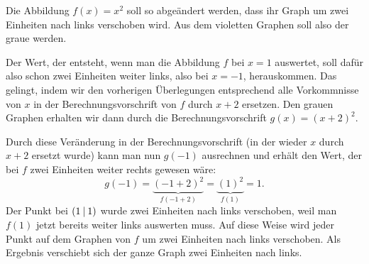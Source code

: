 \documentclass[../../main.tex]{subfiles}
\begin{document}
\begin{example}
    Die Abbildung $f(x)=x^2$ soll so abgeändert werden, dass ihr Graph um zwei Einheiten nach links verschoben wird. Aus dem violetten Graphen soll also der graue werden.
    \begin{center}
    \end{center}
    Der Wert, der entsteht, wenn man die Abbildung $f$ bei $x=1$ auswertet, soll dafür also schon zwei Einheiten weiter links, also bei $x=-1$, herauskommen. Das gelingt, indem wir den vorherigen Überlegungen entsprechend alle Vorkommnisse von $x$ in der Berechnungsvorschrift von $f$ durch $x+2$ ersetzen. Den grauen Graphen erhalten wir dann durch die Berechnungsvorschrift $g(x)=(x+2)^2$. 
    
    Durch diese Veränderung in der Berechnungsvorschrift (in der wieder $x$ durch $x+2$ ersetzt wurde) kann man nun $g(-1)$ ausrechnen und erhält den Wert, der bei $f$ zwei Einheiten weiter rechts gewesen wäre:
    \[g(-1)=\underbrace{(-1+2)^2}_{f(-1+2)}=\underbrace{(1)^2}_{f(1)}=1.\]
    Der Punkt bei $\left(1 \:\middle|\: 1\right)$ wurde zwei Einheiten nach links verschoben, weil man $f(1)$ jetzt bereits weiter links auswerten muss. Auf diese Weise wird jeder Punkt auf dem Graphen von $f$ um zwei Einheiten nach links verschoben. Als Ergebnis verschiebt sich der ganze Graph zwei Einheiten nach links.
\end{example}
\end{document}
